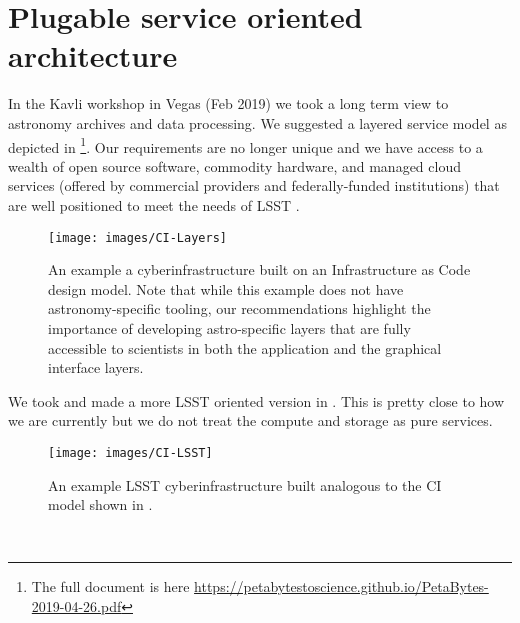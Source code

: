 
\section{Plugable service oriented architecture} \label{sec:arc}

In the Kavli workshop in Vegas (Feb 2019) we took a long term view to astronomy archives and data processing.
We suggested a layered service model as depicted in \footnote{The full document is here \url{https://petabytestoscience.github.io/PetaBytes-2019-04-26.pdf}}.
Our requirements are no longer unique and we have access to a wealth of open source \gls{software}, commodity hardware, and managed \gls{cloud} services (offered by commercial providers and federally-funded institutions) that are well positioned to meet the needs of LSST \cite{2019AAS...23345706M, 2019AAS...23324505B}.


\begin{figure}
    \centering
    \texttt{[image: images/CI-Layers]}
    \caption{An example a \gls{cyberinfrastructure} built on an Infrastructure as Code design model. Note that while this example does not have astronomy-specific tooling, our recommendations highlight the importance of developing astro-specific layers that are fully accessible to scientists in both  the application  and the graphical interface layers. \label{fig:CI}}
\end{figure}


We took  and made a more \gls{LSST} oriented version in . This is pretty close to how we are currently but we do not treat the compute and storage as pure services.

\begin{figure}
    \centering
    \texttt{[image: images/CI-LSST]}
    \caption{An example \gls{LSST}  \gls{cyberinfrastructure} built analogous to the \gls{CI} model shown in .}
    \label{fig:CI-LSST}
\end{figure}\




